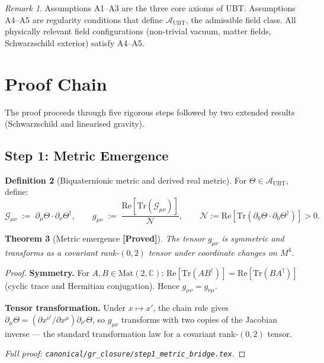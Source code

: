 \documentclass[12pt,a4paper]{article}
\newtheorem{theorem}{Theorem}[section]
\theoremstyle{definition}
\newtheorem{definition}[theorem]{Definition}
\theoremstyle{remark}
\newtheorem{remark}[theorem]{Remark}
\newcommand{\PROVED}{\textbf{[Proved]}}
\begin{document}
\begin{remark}
Assumptions A1--A3 are the three core axioms of UBT.
Assumptions A4--A5 are regularity conditions that define
$\mathcal{A}_{\mathrm{UBT}}$, the admissible field class.
All physically relevant field configurations (non-trivial vacuum,
matter fields, Schwarzschild exterior) satisfy A4--A5.
\end{remark}

\section{Proof Chain}
\label{sec:proof}

The proof proceeds through five rigorous steps followed by two
extended results (Schwarzschild and linearised gravity).

\subsection{Step 1: Metric Emergence}
\label{sec:step1}

\begin{definition}[Biquaternionic metric and derived real metric]
\label{def:metric}
For $\Theta\in\mathcal{A}_{\mathrm{UBT}}$, define:
\[
  \mathcal{G}_{\mu\nu} \;:=\; \partial_\mu\Theta\cdot\partial_\nu\Theta^\dagger,
  \qquad
  g_{\mu\nu} \;:=\; \frac{\mathrm{Re}[\mathrm{Tr}(\mathcal{G}_{\mu\nu})]}{\mathcal{N}},
  \qquad
  \mathcal{N} := \mathrm{Re}[\mathrm{Tr}(\partial_0\Theta\cdot\partial_0\Theta^\dagger)] > 0.
\]
\end{definition}

\begin{theorem}[Metric emergence \PROVED]
\label{thm:metric}
The tensor $g_{\mu\nu}$ is symmetric and transforms as a covariant
rank-$(0,2)$ tensor under coordinate changes on $M^4$.
\end{theorem}

\begin{proof}
\textbf{Symmetry.}  For $A,B\in\mathrm{Mat}(2,\mathbb{C})$:
$\mathrm{Re}[\mathrm{Tr}(AB^\dagger)] = \mathrm{Re}[\mathrm{Tr}(BA^\dagger)]$
(cyclic trace and Hermitian conjugation).  Hence $g_{\mu\nu} = g_{\nu\mu}$.

\textbf{Tensor transformation.}  Under $x\mapsto x'$, the chain rule gives
$\partial_\mu\Theta = (\partial x^{\nu'}/\partial x^\mu)\partial_{\nu'}\Theta$,
so $g_{\mu\nu}$ transforms with two copies of the Jacobian inverse —
the standard transformation law for a covariant rank-$(0,2)$ tensor.

\smallskip
\noindent\textit{Full proof: \texttt{canonical/gr\_closure/step1\_metric\_bridge.tex}.}
\end{proof}
\end{document}
